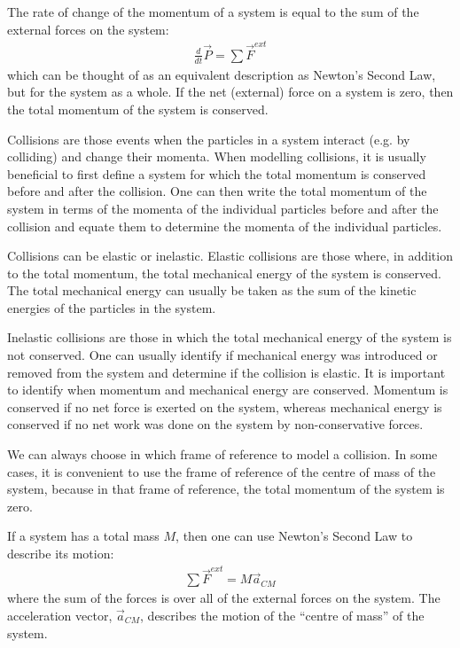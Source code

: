 \begin{chapterSummary}
{The rate of change of the momentum of a system is equal to the sum of the external forces on the system:
\begin{align*}
\frac{d}{dt}\vec P = \sum \vec F^{ext}
\end{align*}
which can be thought of as an equivalent description as Newton's Second Law, but for the system as a whole. If the net (external) force on a system is zero, then the total momentum of the system is conserved. 

Collisions are those events when the particles in a system interact (e.g. by colliding) and change their momenta. When modelling collisions, it is usually beneficial to first define a system for which the total momentum is conserved before and after the collision. One can then write the total momentum of the system in terms of the momenta of the individual particles before and after the collision and equate them to determine the momenta of the individual particles.

Collisions can be elastic or inelastic. Elastic collisions are those where, in addition to the total momentum, the total mechanical energy of the system is conserved. The total mechanical energy can usually be taken as the sum of the kinetic energies of the particles in the system.

Inelastic collisions are those in which the total mechanical energy of the system is not conserved. One can usually identify if mechanical energy was introduced or removed from the system and determine if the collision is elastic. It is important to identify when momentum and mechanical energy are conserved. Momentum is conserved if no net force is exerted on the system, whereas mechanical energy is conserved if no net work was done on the system by non-conservative forces.

We can always choose in which frame of reference to model a collision. In some cases, it is convenient to use the frame of reference of the centre of mass of the system, because in that frame of reference, the total momentum of the system is zero.

If a system has a total mass $M$, then one can use Newton's Second Law to describe its motion:
\begin{align*}
\sum \vec F^{ext} = M \vec a_{CM}
\end{align*}
where the sum of the forces is over all of the external forces on the system. The acceleration vector, $\vec a_{CM}$, describes the motion of the ``centre of mass'' of the system.

}
\end{chapterSummary}
